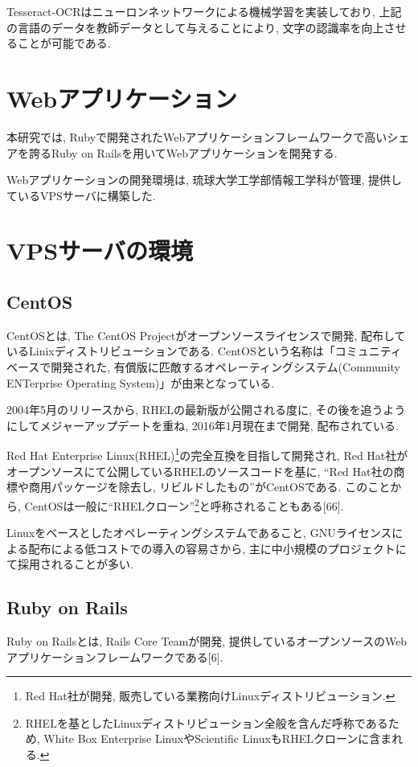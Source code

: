 Tesseract-OCRはニューロンネットワークによる機械学習を実装しており, 上記の言語のデータを教師データとして与えることにより, 文字の認識率を向上させることが可能である.

\section{Webアプリケーション}
本研究では, Rubyで開発されたWebアプリケーションフレームワークで高いシェアを誇るRuby on Railsを用いてWebアプリケーションを開発する.

Webアプリケーションの開発環境は, 琉球大学工学部情報工学科が管理, 提供しているVPSサーバに構築した.

\section{VPSサーバの環境}
\subsection{CentOS}
CentOSとは, The CentOS Projectがオープンソースライセンスで開発, 配布しているLinixディストリビューションである.
CentOSという名称は「コミュニティベースで開発された, 有償版に匹敵するオペレーティングシステム(Community ENTerprise Operating System)」が由来となっている.

2004年5月のリリースから, RHELの最新版が公開される度に, その後を追うようにしてメジャーアップデートを重ね, 2016年1月現在まで開発, 配布されている.

Red Hat Enterprise Linux(RHEL)\footnote{Red Hat社が開発, 販売している業務向けLinuxディストリビューション.}の完全互換を目指して開発され, Red Hat社がオープンソースにて公開しているRHELのソースコードを基に, “Red Hat社の商標や商用パッケージを除去し, リビルドしたもの”がCentOSである.
このことから, CentOSは一般に“RHELクローン”\footnote{RHELを基としたLinuxディストリビューション全般を含んだ呼称であるため, White Box Enterprise LinuxやScientific LinuxもRHELクローンに含まれる.}と呼称されることもある[66].

Linuxをベースとしたオペレーティングシステムであること, GNUライセンスによる配布による低コストでの導入の容易さから, 主に中小規模のプロジェクトにて採用されることが多い.

\subsection{Ruby on Rails}
Ruby on Railsとは, Rails Core Teamが開発, 提供しているオープンソースのWebアプリケーションフレームワークである[6].

